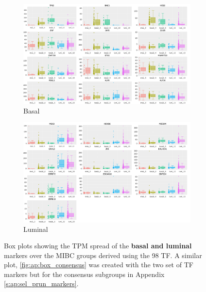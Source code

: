 \begin{figure}[H]
    \centering
    \begin{subfigure}[!t]{1.0\textwidth}
        \includegraphics[width=1.0\textwidth,height=1.0\textheight,keepaspectratio]{Sections/Network_I/Resources/selective_pruning/box_plots/dendrogram_basal.png}
        \caption{Basal}
        \label{fig:N_I:box_basal_dendrogram}
    \end{subfigure}
    \begin{subfigure}[!t]{1.0\textwidth}
      \includegraphics[width=1.0\textwidth,height=1.0\textheight,keepaspectratio]{Sections/Network_I/Resources/selective_pruning/box_plots/dendrogram_lum.png}
      \caption{Luminal}
      \label{fig:N_I:box_luminal_dendrogram}
    \end{subfigure}
    \caption[98 TF: expression of basal and luminal markers in the new groups]{Box plots showing the TPM spread of the \textbf{basal and luminal} markers over the MIBC groups derived using the 98 TF. A similar plot, \cref{fig:ap:box_consensus} was created with the two set of TF markers but for the consensus \citep{Kamoun2020-tj} subgroups in Appendix \cref{s:ap:sel_prun_markers}.}
    \label{fig:N_I:box_debdrogram}
\end{figure}




